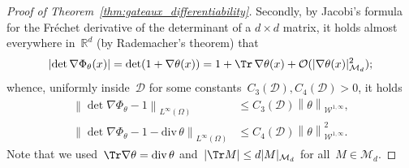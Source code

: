 \documentclass[a4]{article}
\renewcommand{\div}{\mathrm{div}}
\newcommand{\R}{\mathbb{R}}
\newcommand{\1}{\mathbbm 1}
\newcommand{\Winf}{{{\cW}^{1,\infty}}}
\newcommand{\cW}{\mathcal{W}}
\newcommand{\bigo}{\mathcal{O}}
\begin{document}
\begin{proof}[Proof of Theorem~\ref{thm:gateaux_differentiability}]
    Secondly, by Jacobi's formula for the Fréchet derivative of the determinant of a $d\times d$ matrix, it holds almost everywhere in~$\R^d$ (by Rademacher's theorem) that
    \begin{equation}
        \left|\det \nabla \Phi_\theta(x)\right| = \det(1+\nabla \theta(x)) = 1 + \Tr\,\nabla \theta(x) + \bigo(|\nabla\theta(x)|^2_{\mathcal M_d});
    \end{equation}
    whence, uniformly inside~$\mathcal D$ for some constants~$C_3(\mathcal D),C_4(\mathcal D)>0$, it holds
    \begin{equation}
        \label{eq:divergence_estimate}
        \begin{aligned}
            \left\|\det \nabla\Phi_\theta-1\right\|_{L^\infty(\Omega)} &\leq C_3(\mathcal D)\left\|\theta\right\|_{\Winf},\\
            \left\|\det \nabla\Phi_\theta-1-\div\,\theta\right\|_{L^\infty(\Omega)} &\leq C_4(\mathcal D)\left\|\theta\right\|_{\Winf}^2.
        \end{aligned}
    \end{equation}
    Note that we used~$\Tr\nabla \theta = \div\,\theta$ and~$|\Tr M|\leq d|M|_{\mathcal M_d}$ for all~$M\in \mathcal M_d$.


\end{proof}
\end{document}
